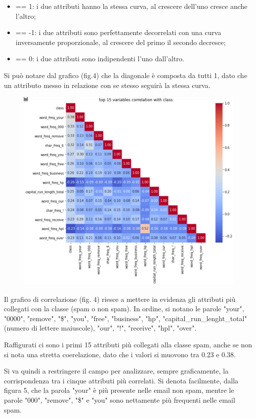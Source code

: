 \documentclass[12pt,a4paper]{article}
\begin{document}
\begin{itemize}
\item == 1: i due attributi hanno la stessa curva, al crescere dell'uno cresce anche l'altro;
\item == -1: i due attributi sono perfettamente decorrelati con una curva inversamente proporzionale, al crescere del primo il secondo decresce;
\item == 0: i due attributi sono indipendenti l'uno dall'altro.
\end{itemize}
 Si può notare dal grafico (fig.4) che la diagonale è composta da tutti 1, dato che un attributo messo in relazione con se stesso seguirà la stessa curva.
\begin{figure}[h]
    \centering
    \includegraphics[scale=0.5]{correlation_top_15.png}
    \caption{}
\end{figure}
Il grafico di correlazione (fig. 4) riesce a mettere in evidenza gli attributi più collegati con la classe (spam o non spam). In ordine, si notano le parole "your", "0000", "remove", "\$", "you", "free", "business", "hp", "capital\_run\_lenght\_total" (numero di lettere maiuscole), "our", "!", "receive", "hpl", "over".

Raffigurati ci sono i primi 15 attributi più collegati alla classe spam, anche se non si nota una stretta coerelazione, dato che i valori si muovono tra 0.23 e 0.38.

Si va quindi a restringere il campo per analizzare, sempre graficamente, la corrispondenza tra i cinque attributi più correlati. Si denota facilmente, dalla figura 5, che la parola "your" è più presente nelle email non spam, mentre le parole "000", "remove", "\$" e "you" sono nettamente più frequenti nelle email spam.
\end{document}
